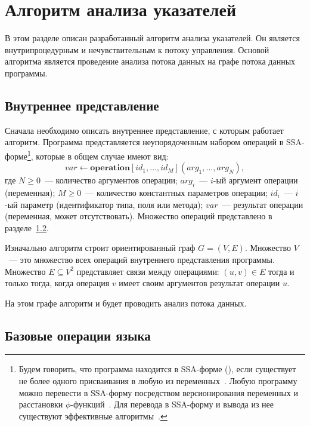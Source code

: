 \documentclass[14pt,titlepage,draft]{extarticle}
\newcommand{\java}{\eng{Java}\xspace}
\let\mathphi\phi
\renewcommand{\phi}{\ensuremath{\mathphi}}
\newcommand{\op}[1]{\mathbf{#1}}
\begin{document}
  \section{Алгоритм анализа указателей}

    В этом разделе описан разработанный алгоритм анализа указателей. Он является
    внутрипроцедурным и нечувствительным к потоку управления. Основой алгоритма
    является проведение анализа потока данных на графе потока данных программы.

  \subsection{Внутреннее представление}
    \label{section:dfg}

    Сначала необходимо описать внутреннее представление, с которым работает
    алгоритм. Программа представляется неупорядоченным набором операций в
    SSA-форме\footnote{
      Будем говорить, что программа находится в SSA-форме (), если существует не более одного присваивания в любую из
      переменных~\cite{ssa}.
      Любую программу можно перевести в SSA-форму посредством
      версионирования переменных и расстановки \phi-функций~\cite{ssa}.
      Для перевода в SSA-форму и вывода из нее существуют эффективные
      алгоритмы~\cite{bilardi_ssa, briggs_ssa}.
    }, которые в общем случае имеют вид:
    \[ var \gets \op{operation}[id_1, \ldots, id_M](arg_1, \ldots, arg_N), \]
    где
    $N \geq 0$~--- количество аргументов операции;
    $arg_i$~--- $i$-ый аргумент операции (переменная);
    $M \geq 0$~--- количество константных параметров операции;
    $id_i$~--- $i$-ый параметр (идентификатор типа, поля или метода);
    $var$~--- результат операции (переменная, может отсутствовать).
    Множество операций представлено в разделе~\ref{section:ir_ops}.

    Изначально алгоритм строит ориентированный граф $G = (V, E)$. Множество
    $V$~--- это множество всех операций внутреннего
    представления программы.
    Множество $E \subseteq V^2$ представляет связи между операциями:
    $(u, v) \in E$ тогда и только тогда, когда операция $v$ имеет своим
    аргументов результат операции $u$.

    На этом графе алгоритм и будет проводить анализ потока данных.

  \subsection{Базовые операции языка \texorpdfstring{\java}{Java}}
    \label{section:ir_ops}
\end{document}
